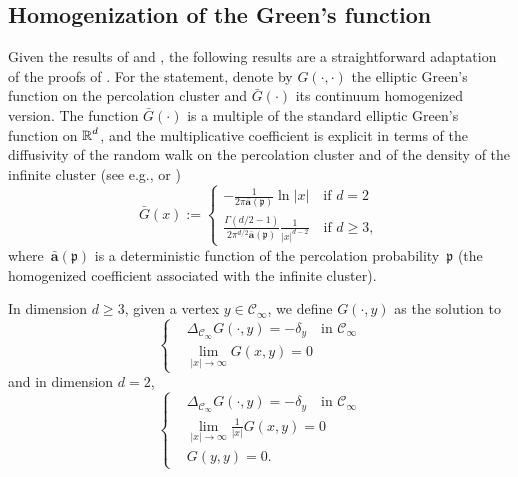 \documentclass[12pt]{amsart}
\numberwithin{equation}{section}
\begin{document}
	\subsection{Homogenization of the Green's function}
	Given the results of \cite{armstrong-dario-2018} and \cite{dario-gu-green}, the following results are a straightforward adaptation of the proofs of \cite[Theorem 8.14 and Theorem 8.20]{AKM19}. 
	For the statement, denote by $G(\cdot, \cdot)$ the elliptic Green's function on the percolation cluster and $\bar{G}(\cdot)$ its continuum homogenized version. The function $\bar{G}(\cdot)$ is a multiple of the standard elliptic Green's function on $\operatorname{\mathbb{R}}^d$, and the multiplicative coefficient is explicit in terms of the diffusivity of the random walk on the percolation cluster and of the density of the infinite cluster (see e.g., \cite[(1.9)]{BH09} or \cite[(1.9)]{dario-gu-green})
	\[
	\bar{G}(x) := 
	\begin{cases}
		- \frac{1}{2\pi \bar{\mathbf{a}}(\mathfrak p)} \ln |x| \quad \mbox{if~$d = 2$}  \\
		\frac{\Gamma(d/2 -1)}{2 \pi^{d/2} \bar{\mathbf{a}}(\mathfrak p)} \frac{1}{|x|^{d-2}} \quad \mbox{if~$d \geq 3$}, 
	\end{cases}
	\]
	where~$\bar{\mathbf{a}}( \mathfrak{p})$ is a deterministic function of the percolation probability~$ \mathfrak{p}$ (the homogenized coefficient associated with the infinite cluster).
	
	In dimension $d \geq 3$, given a vertex $y \in \mathscr{C}_{\infty}$,
	we define $G(\cdot, y)$ as the solution to
	\begin{equation} \label{eq:green-function-3D}
		\begin{cases}
			&\Delta_{\mathscr{C}_{\infty}} G(\cdot, y) = -\delta_y \quad \mbox{in $\mathscr{C}_{\infty}$} \\
			&\lim_{|x| \to \infty} G(x, y) =  0
		\end{cases}
	\end{equation}
	and in dimension $d = 2$, 
	\begin{equation} \label{eq:green-function-2D}
		\begin{cases}
			&\Delta_{\mathscr{C}_{\infty}} G(\cdot, y) = -\delta_y \quad \mbox{in $\mathscr{C}_{\infty}$} \\
			&\lim_{|x| \to \infty} \frac{1}{|x|} G(x, y) =  0 \\
			& G(y,y) = 0.
		\end{cases}
	\end{equation}
	
\end{document}
